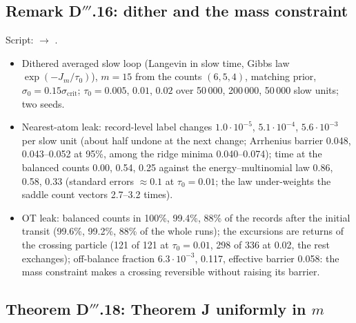 \subsection{Remark D\texorpdfstring{$'''$}{'''}.16: dither and the mass constraint}

Script:  $\to$ .
\begin{itemize}
  \item Dithered averaged slow loop (Langevin in slow time, Gibbs law $\exp(-J_m/\tau_0)$), $m=15$ from the counts
    $(6,5,4)$, matching prior, $\sigma_0=0.15\sigma_{\mathrm{crit}}$; $\tau_0=0.005$, $0.01$, $0.02$ over 50\,000,
    200\,000, 50\,000 slow units; two seeds.
  \item Nearest-atom leak: record-level label changes $1.0\cdot10^{-5}$, $5.1\cdot10^{-4}$, $5.6\cdot10^{-3}$ per slow
    unit (about half undone at the next change; Arrhenius barrier 0.048, 0.043--0.052 at 95\%, among the ridge minima
    0.040--0.074); time at the balanced counts 0.00, 0.54, 0.25 against the energy--multinomial law 0.86, 0.58, 0.33
    (standard errors $\approx0.1$ at $\tau_0=0.01$; the law under-weights the saddle count vectors 2.7--3.2 times).
  \item OT leak: balanced counts in 100\%, 99.4\%, 88\% of the records after the initial transit (99.6\%, 99.2\%,
    88\% of the whole runs); the excursions are returns of the crossing particle (121 of 121 at $\tau_0=0.01$, 298 of
    336 at 0.02, the rest exchanges); off-balance fraction $6.3\cdot10^{-3}$, 0.117, effective barrier 0.058: the mass
    constraint makes a crossing reversible without raising its barrier.
\end{itemize}

\subsection{Theorem D\texorpdfstring{$'''$}{'''}.18: Theorem J uniformly in \texorpdfstring{$m$}{m}}


